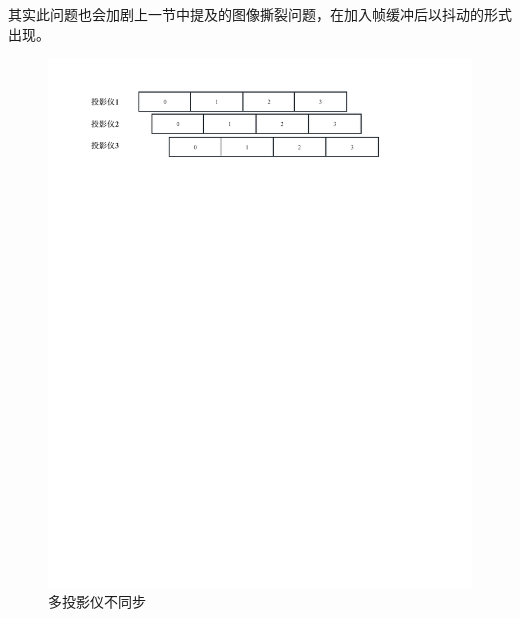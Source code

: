 其实此问题也会加剧上一节中提及的图像撕裂问题，在加入帧缓冲后以抖动的形式出现。
\begin{figure}[h!]
    \begin{center}
        \includegraphics[width=\textwidth]{pictures/present.pdf}
        \caption{多投影仪不同步}
        \label{present}
    \end{center}
\end{figure}
